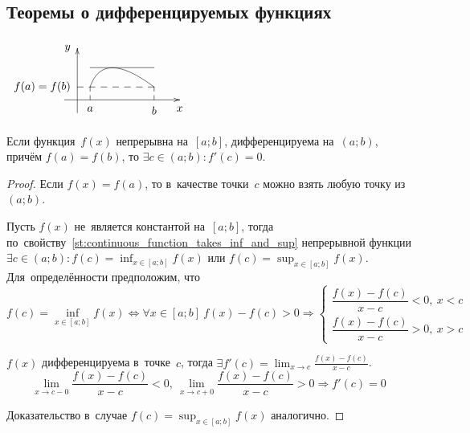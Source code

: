 \subsection{Теоремы о дифференцируемых функциях}
\begin{floatingfigure}[r]{58mm}
\noindent
$\begin{xy} /r8mm/:
(-0.5, 0); (4, 0) **@{-} *@{>} *++!U{x};
(0, -0.5); (0, 2) **@{-} *@{>} *++!R{y};
(0.5, 0.5) = "a"; (3, 0.5) = "b" **\crv{(1, 2)};
"a"; (0.5, 0) **@{--} *++!U{a};
"b"; (3, 0) **@{--} *++!U{b};
"b"; (0, 0.5) **@{--} *++!R{f(a) = f(b)};
(0.5, 1.2525); (3, 1.2525) **@{-};
\end{xy}$
\end{floatingfigure}
\begin{theorem}[Ролля]
\label{th:Rolle's}
Если функция~$f(x)$ непрерывна на~$[a; b]$, дифференцируема на~$(a; b)$, причём $f(a) = f(b)$, то $\exists c \in (a; b) \colon f'(c) = 0$.
\end{theorem}
\begin{proof}
Если $f(x) = f(a)$, то в~качестве точки~$c$ можно взять любую точку из~$(a; b)$.

Пусть $f(x)$ не~является константой на~$[a; b]$, тогда по~свойству~\ref{st:continuous_function_takes_inf_and_sup} непрерывной функции $\displaystyle \exists c \in (a; b) \colon f(c) = \inf_{x \in [a; b]} f(x) \text{ или } f(c) = \sup_{x \in [a; b]} f(x)$.
Для~определённости предположим, что
\begin{equation*}
f(c) = \inf_{x \in [a; b]} f(x) \Leftrightarrow
\forall x \in [a; b] \ f(x) - f(c) > 0 \Rightarrow
\begin{cases}
\dfrac{f(x) - f(c)}{x - c} < 0, \ x < c \\
\dfrac{f(x) - f(c)}{x - c} > 0, \ x > c
\end{cases}
\end{equation*}

$f(x)$ дифференцируема в~точке~$c$, тогда $\displaystyle \exists f'(c) = \lim_{x \to c} \frac{f(x) - f(c)}{x - c}$.
\begin{equation*}
\lim_{x \to c-0} \frac{f(x) - f(c)}{x - c} < 0, \
\lim_{x \to c+0} \frac{f(x) - f(c)}{x - c} > 0 \Rightarrow
f'(c) = 0
\end{equation*}

Доказательство в~случае $\displaystyle f(c) = \sup_{x \in [a; b]} f(x)$ аналогично.
\end{proof}


